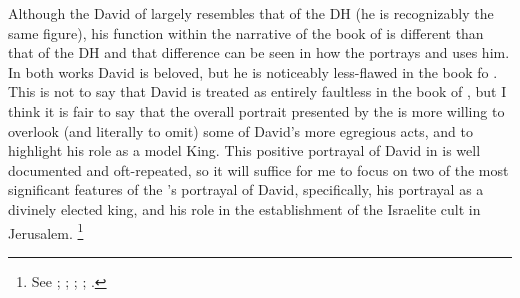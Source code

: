 Although the David of \chronicles largely resembles that of the DH (he is recognizably the same figure), his function within the narrative of the book of \chronicles is different than that of the DH and that difference can be seen in how the \chronicler portrays and uses him. In both works David is beloved, but he is noticeably less-flawed in the book fo \chronicles. This is not to say that  David is treated as entirely faultless in the book of \chronicles, but I think it is fair to say that the overall portrait presented by the \chronicler is more willing to overlook (and literally to omit) some of David's more egregious acts, and to highlight his role as a model King. This positive portrayal of David in \chronicles is well documented and oft-repeated, so it will suffice for me to focus on two of the most significant features of the \chronicler's portrayal of David, specifically, his portrayal as a divinely elected king, and his role in the establishment of the Israelite cult in Jerusalem.%
    \footnote{See \cite{jarick_frohlich2019}; \cite[347--383]{japhet2009} \cite{knoppers_biblica1995}; \cite[47--48]{japhet1993}; \cite[44--48]{klein2006}; \cite[80--85]{knoppers2003}.}

